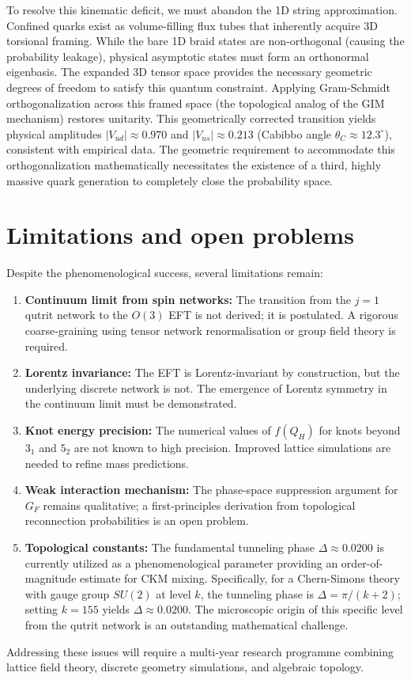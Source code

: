 \documentclass[12pt,a4paper]{article}
\begin{document}
To resolve this kinematic deficit, we must abandon the 1D string approximation. Confined quarks exist as volume-filling flux tubes that inherently acquire 3D torsional framing. While the bare 1D braid states are non-orthogonal (causing the probability leakage), physical asymptotic states must form an orthonormal eigenbasis. The expanded 3D tensor space provides the necessary geometric degrees of freedom to satisfy this quantum constraint. Applying Gram-Schmidt orthogonalization across this framed space (the topological analog of the GIM mechanism) restores unitarity. This geometrically corrected transition yields physical amplitudes $|V_{ud}| \approx 0.970$ and $|V_{us}| \approx 0.213$ (Cabibbo angle $\theta_C \approx 12.3^\circ$), consistent with empirical data. The geometric requirement to accommodate this orthogonalization mathematically necessitates the existence of a third, highly massive quark generation to completely close the probability space.

\section{Limitations and open problems}
\label{sec:limitations}

Despite the phenomenological success, several limitations remain:
\begin{enumerate}
\item \textbf{Continuum limit from spin networks:} The transition from the $j=1$ qutrit network to the $O(3)$ EFT is not derived; it is postulated. A rigorous coarse‑graining using tensor network renormalisation or group field theory is required.
\item \textbf{Lorentz invariance:} The EFT is Lorentz‑invariant by construction, but the underlying discrete network is not. The emergence of Lorentz symmetry in the continuum limit must be demonstrated.
\item \textbf{Knot energy precision:} The numerical values of $f(Q_H)$ for knots beyond $3_1$ and $5_2$ are not known to high precision. Improved lattice simulations are needed to refine mass predictions.
\item \textbf{Weak interaction mechanism:} The phase‑space suppression argument for $G_F$ remains qualitative; a first‑principles derivation from topological reconnection probabilities is an open problem.
\item \textbf{Topological constants:} The fundamental tunneling phase $\Delta \approx 0.0200$ is currently utilized as a phenomenological parameter providing an order-of-magnitude estimate for CKM mixing. Specifically, for a Chern-Simons theory with gauge group $SU(2)$ at level $k$, the tunneling phase is $\Delta = \pi/(k+2)$; setting $k=155$ yields $\Delta \approx 0.0200$. The microscopic origin of this specific level from the qutrit network is an outstanding mathematical challenge.
\end{enumerate}
Addressing these issues will require a multi‑year research programme combining lattice field theory, discrete geometry simulations, and algebraic topology.
\end{document}
